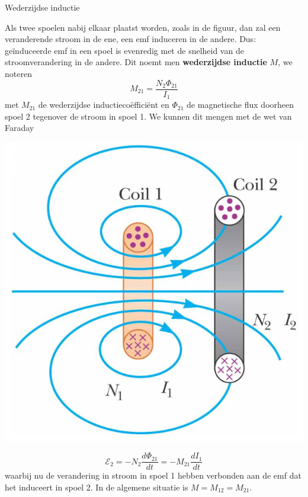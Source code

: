 \begin{theo}{Wederzijdse inductie}
    \begin{minipage}{.78\textwidth}
        Als twee spoelen nabij elkaar plaatst worden, zoals in de figuur, dan zal een veranderende stroom in de ene, 
        een emf induceren in de andere. Dus: geïnduceerde emf in een spoel is evenredig met de snelheid van de stroomverandering
        in de andere. Dit noemt men \textbf{wederzijdse inductie} $M$, we noteren
        \begin{equation*}
            M_{21} = \dfrac{N_{2}\Phi_{21}}{I_{1}} 
        \end{equation*}
        met $M_{21}$ de wederzijdse inductiecoëfficiënt en $\Phi_{21}$ de magnetische flux doorheen spoel 2 tegenover de stroom in spoel 1.
        We kunnen dit mengen met de wet van Faraday
    \end{minipage}
    \begin{minipage}{.18\textwidth}
        \includegraphics[scale=0.3]{Images/Magnetisme/WederzijdseInductie}
    \end{minipage}
    \begin{equation*}
        \mathcal{E}_{2} = - N_{2}\dfrac{d\Phi_{21}}{dt} = - M_{21}\dfrac{dI_{1}}{dt}
    \end{equation*}
    waarbij nu de verandering in stroom in spoel 1 hebben verbonden aan de emf dat het induceert in spoel 2.  In de algemene situatie is 
    $M = M_{12} = M_{21}$.
\end{theo}

